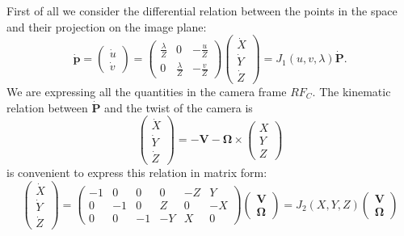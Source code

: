 \documentclass[10pt, a4paper]{report}
\begin{document}
First of all we consider the differential relation between the points in the space and their projection on the image plane:\begin{equation}
    \dot{\mathbf p}=\begin{pmatrix}
        \dot u\\ 
        \dot v
    \end{pmatrix}=\begin{pmatrix}
        \displaystyle\frac{\lambda}{Z}&0&\displaystyle-\frac{u}{Z}\\[1.5ex]
        \displaystyle0&\displaystyle\frac{\lambda}{Z}&\displaystyle-\frac{v}{Z}
    \end{pmatrix}\begin{pmatrix}
        \dot X\\ \dot Y\\ \dot Z 
    \end{pmatrix}=J_1(u,v,\lambda)\dot{\mathbf P}.
\end{equation}
We are expressing all the quantities in the camera frame $RF_C$. The kinematic relation between $\dot{\mathbf P}$ and the twist of the camera is\begin{equation}
    \begin{pmatrix}
        \dot X\\ \dot Y\\ \dot Z 
    \end{pmatrix}=-\mathbf V-\boldsymbol{\Omega}\times \begin{pmatrix}
         X\\  Y\\  Z 
    \end{pmatrix}
\end{equation}
is convenient to express this relation in matrix form:
\begin{equation}
    \begin{pmatrix}
        \dot X\\ \dot Y\\ \dot Z 
    \end{pmatrix}=\begin{pmatrix}
        -1&0&0&0&-Z&Y\\ 
        0&-1&0&Z&0&-X\\ 
        0&0&-1&-Y&X&0
    \end{pmatrix}\begin{pmatrix}
         \mathbf V\\\boldsymbol{\Omega}
    \end{pmatrix}=J_2(X,Y,Z)\begin{pmatrix}
         \mathbf V\\\boldsymbol{\Omega}
    \end{pmatrix}
\end{equation}
\end{document}
